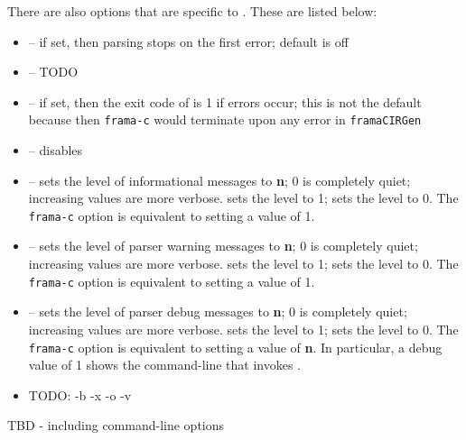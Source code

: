 There are also options that are specific to \fcl.
These are listed below:
\begin{itemize}
	\item {} -- if set, then parsing stops on the first error; default is off
	\item {} -- TODO
	\item {} -- if set, then the exit code of \irg is 1 if errors occur; this is not the default because then \lstinline|frama-c| would terminate upon
	any error in \lstinline|framaCIRGen|
	\item {} -- disables 
	\item {} -- sets the level of informational messages to \textbf{n}; 0 is completely quiet; increasing values are
	more verbose.  sets the level to 1; 
	 sets the level to 0. The \lstinline|frama-c| option  is equivalent to setting a value of 1.
	\item {} -- sets the level of parser warning messages to \textbf{n}; 0 is completely quiet; increasing values are
more verbose.  sets the level to 1; 
 sets the level to 0. The \lstinline|frama-c| option  is equivalent to setting a value of 1.

	\item {} -- sets the level of parser debug messages to \textbf{n}; 0 is completely quiet; increasing values are
more verbose.  sets the level to 1; 
 sets the level to 0. The \lstinline|frama-c| option  is equivalent to setting a value of \textbf{n}.
In particular, a debug value of 1 shows the command-line that invokes
\irg.
\item TODO: -b -x -o -v
	
\end{itemize}


TBD - including command-line options

